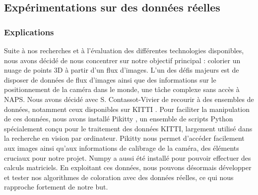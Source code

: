 \subsection{Expérimentations sur des données réelles}
    \subsubsection{Explications}
        \normalsize{
            Suite à nos recherches et à l'évaluation des différentes technologies disponibles, nous avons décidé de nous concentrer sur notre objectif principal : colorier un nuage de points 3D à partir d'un flux d'images. L'un des défis majeurs est de disposer de données de flux d'images ainsi que des informations sur le positionnement de la caméra dans le monde, une tâche complexe sans accès à NAPS. Nous avons décidé avec S. Contassot-Vivier de recourir à des ensembles de données, notamment ceux disponibles sur KITTI \cite{kitti_dataset}. Pour faciliter la manipulation de ces données, nous avons installé Pikitty \cite{kitti_pykitti}, un ensemble de scripts Python spécialement conçu pour le traitement des données KITTI, largement utilisé dans la recherche en vision par ordinateur. Pikitty nous permet d'accéder facilement aux images ainsi qu'aux informations de calibrage de la caméra, des éléments cruciaux pour notre projet. Numpy a aussi été installé pour pouvoir effectuer des calculs matriciels. En exploitant ces données, nous pouvons désormais développer et tester nos algorithmes de coloration avec des données réelles, ce qui nous rapproche fortement de notre but.
        }

